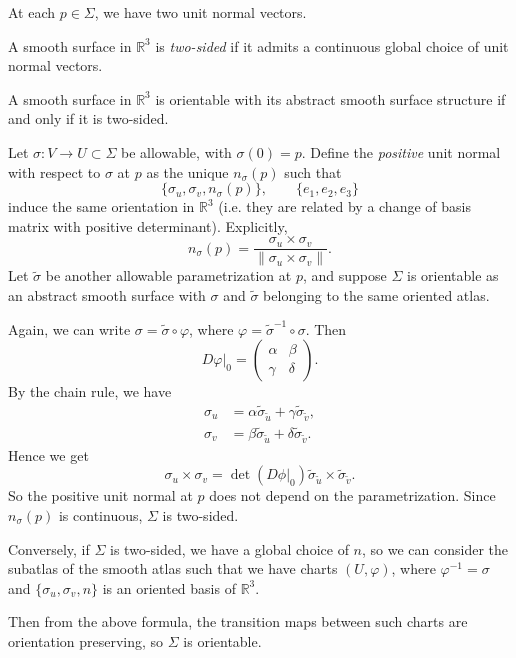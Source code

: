 \documentclass[12pt]{article}
\begin{document}
At each $p \in \Sigma$, we have two unit normal vectors.

\begin{definition}
	A smooth surface in $\mathbb{R}^3$ is \emph{two-sided} if it admits a continuous global choice of unit normal vectors.
\end{definition}

\begin{lemma}
	A smooth surface in $\mathbb{R}^3$ is orientable with its abstract smooth surface structure if and only if it is two-sided.
\end{lemma}

\begin{proofbox}
	Let $\sigma : V \to U \subset \Sigma$ be allowable, with $\sigma(0) = p$. Define the \emph{positive} unit normal with respect to $\sigma$ at $p$ as the unique $n_{\sigma}(p)$ such that
	\[
		\{\sigma_u, \sigma_v, n_{\sigma}(p)\}, \qquad \{e_1, e_2, e_3\}
	\]
	induce the same orientation in $\mathbb{R}^3$ (i.e. they are related by a change of basis matrix with positive determinant). Explicitly,
	\[
	n_{\sigma}(p) = \frac{\sigma_u \times \sigma_v}{\| \sigma_u \times \sigma_v \|}
	.\]
	Let $\tilde \sigma$ be another allowable parametrization at $p$, and suppose $\Sigma$ is orientable as an abstract smooth surface with $\sigma$ and $\tilde \sigma$ belonging to the same oriented atlas.

	Again, we can write $\sigma = \tilde \sigma \circ \varphi$, where $\varphi = \tilde \sigma^{-1} \circ \sigma$. Then
	\[
	D \varphi|_0 =
	\begin{pmatrix}
		\alpha & \beta \\
		\gamma & \delta
	\end{pmatrix}
	.\]
	By the chain rule, we have
	\begin{align*}
		\sigma_u &= \alpha \tilde \sigma_{\tilde u} + \gamma \tilde \sigma_{\tilde v}, \\
		\sigma_v &= \beta \tilde \sigma_{\tilde u} + \delta \tilde \sigma_{\tilde v}.
	\end{align*}
	Hence we get
	\[
	\sigma_u \times \sigma_v = \det (D\phi|_0) \tilde \sigma_{\tilde u} \times \tilde \sigma_{\tilde v}
	.\]
	So the positive unit normal at $p$ does not depend on the parametrization. Since $n_{\sigma}(p)$ is continuous, $\Sigma$ is two-sided.

	Conversely, if $\Sigma$ is two-sided, we have a global choice of $n$, so we can consider the subatlas of the smooth atlas such that we have charts $(U, \varphi)$, where $\varphi^{-1} = \sigma$ and $\{\sigma_u, \sigma_v, n\}$ is an oriented basis of $\mathbb{R}^3$.

	Then from the above formula, the transition maps between such charts are orientation preserving, so $\Sigma$ is orientable.
\end{proofbox}
\end{document}
